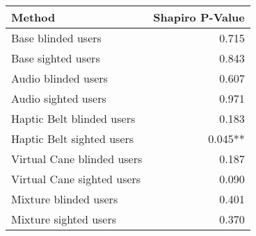 
\centering
\begin{tabular}{lr}
\toprule
                    Method & Shapiro P-Value \\
\midrule
        Base blinded users &           0.715 \\
        Base sighted users &           0.843 \\
       Audio blinded users &           0.607 \\
       Audio sighted users &           0.971 \\
 Haptic Belt blinded users &           0.183 \\
 Haptic Belt sighted users &         0.045** \\
Virtual Cane blinded users &           0.187 \\
Virtual Cane sighted users &           0.090 \\
     Mixture blinded users &           0.401 \\
     Mixture sighted users &           0.370 \\
\bottomrule
\end{tabular}
